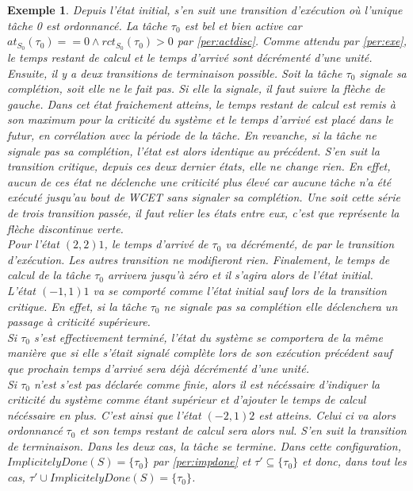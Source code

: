 \documentclass[12pt,a4paper,oneside]{book}
\theoremstyle{break}
\newtheorem{exem}{Exemple}[chapter]
\theoremstyle{breakplain}
\begin{document}
\begin{exem}
Depuis l'état initial, s'en suit une transition d'exécution où l'unique tâche 0 est ordonnancé. La tâche $\tau_0$ est bel et bien active car $at_{S_0}(\tau_0) == 0 \wedge rct_{S_0}(\tau_0) > 0$ par \autoref{per:actdisc}. Comme attendu par \autoref{per:exe}, le temps restant de calcul et le temps d'arrivé sont décrémenté d'une unité. Ensuite, il y a deux transitions de terminaison possible. Soit la tâche $\tau_0$ signale sa complétion, soit elle ne le fait pas. Si elle la signale, il faut suivre la flèche de gauche. Dans cet état fraichement atteins, le temps restant de calcul est remis à son maximum pour la criticité du système et le temps d'arrivé est placé dans le futur, en corrélation avec la période de la tâche. En revanche, si la tâche ne signale pas sa complétion, l'état est alors identique au précédent. S'en suit la transition critique, depuis ces deux dernier états, elle ne change rien. En effet, aucun de ces état ne déclenche une criticité plus élevé car aucune tâche n'a été exécuté jusqu'au bout de WCET sans signaler sa complétion. Une soit cette série de trois transition passée, il faut relier les états entre eux, c'est que représente la flèche discontinue verte.\\

Pour l'état $(2, 2) 1$, le temps d'arrivé de $\tau_0$ va décrémenté, de par le transition d'exécution. Les autres transition ne modifieront rien. Finalement, le temps de calcul de la tâche $\tau_0$ arrivera jusqu'à zéro et il s'agira alors de l'état initial.\\

L'état $(-1, 1) 1$ va se comporté comme l'état initial sauf lors de la transition critique. En effet, si la tâche $\tau_0$ ne signale pas sa complétion elle déclenchera un passage à criticité supérieure.\\
Si $\tau_0$ s'est effectivement terminé, l'état du système se comportera de la même manière que si elle s'était signalé complète lors de son exécution précédent sauf que prochain temps d'arrivé sera déjà décrémenté d'une unité.\\

Si $\tau_0$ n'est s'est pas déclarée comme finie, alors il est nécéssaire d'indiquer la criticité du système comme étant supérieur et d'ajouter le temps de calcul nécéssaire en plus. C'est ainsi que l'état $(-2, 1) 2$ est atteins. Celui ci va alors ordonnancé $\tau_0$ et son temps restant de calcul sera alors nul. S'en suit la transition de terminaison. Dans les deux cas, la tâche se termine. Dans cette configuration, $ImplicitelyDone(S) = \{\tau_0\}$ par \autoref{per:impdone} et $\tau' \subseteq \{\tau_0\}$ et donc, dans tout les cas, $\tau' \cup ImplicitelyDone(S) = \{\tau_0\}$.\\


\end{exem}
\end{document}
